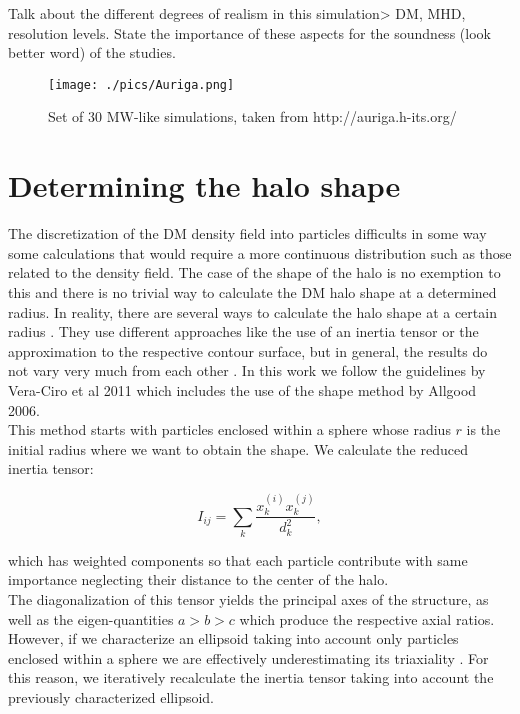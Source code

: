 Talk about the different degrees of realism in this simulation> DM, MHD, resolution levels. State the importance of these aspects for the soundness (look better word) of the studies.\\

\begin{figure}[!ht]
    \centering
    \texttt{[image: ./pics/Auriga.png]}
    \caption{Set of 30 MW-like simulations, taken from http://auriga.h-its.org/}
    \label{fig:auriga}
\end{figure}

\section{Determining the halo shape}
The discretization of the DM density field into particles difficults in some way some calculations that would require a more continuous distribution such as those related to the density field. The case of the shape of the halo is no exemption to this and there is no trivial way to calculate the DM halo shape at a determined radius. In reality, there are several ways to calculate the halo shape at a certain radius \cite{halo shapes}. They use different approaches like the use of an inertia tensor or the approximation to the respective contour surface, but in general, the results do not vary very much from each other \cite{Vera-Ciro et al. 2011}. In this work we follow the guidelines by Vera-Ciro et al 2011 which includes the use of the shape method by Allgood 2006\cite{AllGood2006}.\\

This method starts with particles enclosed within a sphere whose radius $r$ is the initial radius where we want to obtain the shape. We calculate the reduced inertia tensor:

\begin{equation}
I_{ij} = \sum_k \frac{x_k^{(i)}x_k^{(j)}}{d^2_k},
\label{eq:inertia}
\end{equation}

which has weighted components so that each particle contribute with same importance neglecting their distance to the center of the halo.\\

The diagonalization of this tensor yields the principal axes of the structure, as well as the eigen-quantities $a>b>c$ which produce the respective axial ratios. However, if we characterize an ellipsoid taking into account only particles enclosed within a sphere we are effectively underestimating its triaxiality \cite{AllGood}. For this reason, we iteratively recalculate the inertia tensor taking into account the previously characterized ellipsoid.\\

